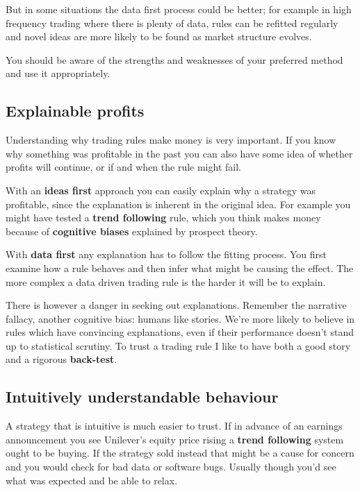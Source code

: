 But in some situations the data first process could be better; for example in high frequency trading where there is plenty of data, rules can be refitted regularly and novel ideas are more likely to be found as market structure evolves.

You should be aware of the strengths and weaknesses of your preferred method and use it appropriately.

\subsection*{Explainable profits}

Understanding why trading rules make money is very important. If you know why something was profitable in the past you can also have some idea of whether profits will continue, or if and when the rule might fail.

With an \textbf{ideas first} approach you can easily explain why a strategy was profitable, since the explanation is inherent in the original idea. For example you might have tested a \textbf{trend following} rule, which you think makes money because of \textbf{cognitive biases} explained by prospect theory.

With \textbf{data first} any explanation has to follow the fitting process. You first examine how a rule behaves and then infer what might be causing the effect. The more complex a data driven trading rule is the harder it will be to explain.

There is however a danger in seeking out explanations. Remember the narrative fallacy, another cognitive bias: humans like stories. We're more likely to believe in rules which have convincing explanations, even if their performance doesn't stand up to statistical scrutiny. To trust a trading rule I like to have both a good story and a rigorous \textbf{back-test}.

\subsection*{Intuitively understandable behaviour}

A strategy that is intuitive is much easier to trust. If in advance of an earnings announcement you see Unilever's equity price rising a \textbf{trend following} system ought to be buying. If the strategy sold instead that might be a cause for concern and you would check for bad data or software bugs. Usually though you'd see what was expected and be able to relax.

